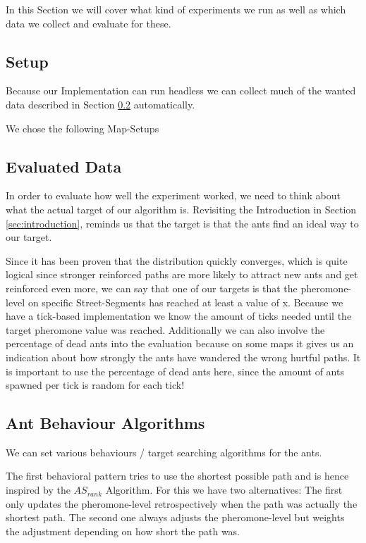 
In this Section we will cover what kind of experiments we run as well as which data we collect and evaluate for these.

\subsection{Setup}

Because our Implementation can run headless we can collect much of the wanted data described in Section \ref{sec:experimentevdata} automatically. 

We chose the following Map-Setups 

\subsection{Evaluated Data}
\label{sec:experimentevdata}

In order to evaluate how well the experiment worked, we need to think about what the actual target of our algorithm is. Revisiting the Introduction in Section \ref{sec:introduction}, reminds us that the target is that the ants find an ideal way to our target.

Since it has been proven that the distribution quickly converges\cite[P. 15]{maniezzo2002ant.pdf}, which is quite logical since stronger reinforced paths are more likely to attract new ants and get reinforced even more, we can say that one of our targets is that the pheromone-level on specific Street-Segments has reached at least a value of x.
Because we have a tick-based implementation we know the amount of ticks needed until the target pheromone value was reached. Additionally we can also involve the percentage of dead ants into the evaluation because on some maps it gives us an indication about how strongly the ants have wandered  the wrong hurtful paths. It is important to use the percentage of dead ants here, since the amount of ants spawned per tick is random for each tick!


\subsection{Ant Behaviour Algorithms}
We can set various behaviours / target searching algorithms for the ants.

The first behavioral pattern tries to use the shortest possible path and is hence inspired by the $AS_{rank}$ Algorithm\cite{zecchin2007ant}.
For this we have two alternatives: The first only updates the pheromone-level retrospectively when the path was actually the shortest path. The second one always adjusts the pheromone-level but weights the adjustment depending on how short the path was.

